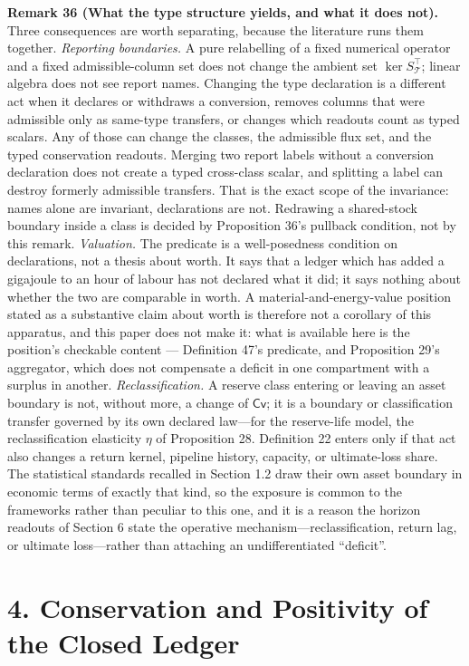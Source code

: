 \documentclass[11pt]{article}
\begin{document}
\textbf{Remark 36 (What the type structure yields, and what it does not).} Three consequences are worth separating, because the literature runs them together. \emph{Reporting boundaries.} A pure relabelling of a fixed numerical operator and a fixed admissible-column set does not change the ambient set \(\ker S_{\mathcal{T}}^\top\); linear algebra does not see report names. Changing the type declaration is a different act when it declares or withdraws a conversion, removes columns that were admissible only as same-type transfers, or changes which readouts count as typed scalars. Any of those can change the classes, the admissible flux set, and the typed conservation readouts. Merging two report labels without a conversion declaration does not create a typed cross-class scalar, and splitting a label can destroy formerly admissible transfers. That is the exact scope of the invariance: names alone are invariant, declarations are not. Redrawing a shared-stock boundary inside a class is decided by Proposition 36's pullback condition, not by this remark. \emph{Valuation.} The predicate is a well-posedness condition on declarations, not a thesis about worth. It says that a ledger which has added a gigajoule to an hour of labour has not declared what it did; it says nothing about whether the two are comparable in worth. A material-and-energy-value position stated as a substantive claim about worth is therefore not a corollary of this apparatus, and this paper does not make it: what is available here is the position's checkable content --- Definition 47's predicate, and Proposition 29's aggregator, which does not compensate a deficit in one compartment with a surplus in another. \emph{Reclassification.} A reserve class entering or leaving an asset boundary is not, without more, a change of \(\mathsf{Cv}\); it is a boundary or classification transfer governed by its own declared law---for the reserve-life model, the reclassification elasticity \(\eta\) of Proposition 28. Definition 22 enters only if that act also changes a return kernel, pipeline history, capacity, or ultimate-loss share. The statistical standards recalled in Section 1.2 draw their own asset boundary in economic terms of exactly that kind, so the exposure is common to the frameworks rather than peculiar to this one, and it is a reason the horizon readouts of Section 6 state the operative mechanism---reclassification, return lag, or ultimate loss---rather than attaching an undifferentiated ``deficit''.

\section*{4. Conservation and Positivity of the Closed Ledger}\label{4-conservation-and-positivity-of-the-closed-ledger}
\end{document}
